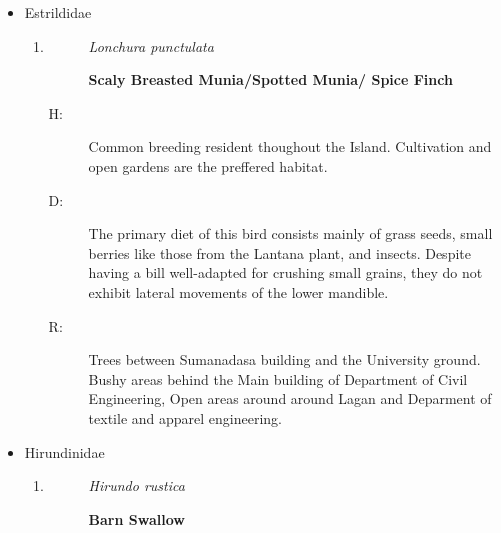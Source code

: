 \begin{itemize}
\begin{enumerate}
%
\end{enumerate}%
\item%
Estrildidae%
\begin{enumerate}%
\item%
\begin{description}%
\item[]%
\textit{Lonchura punctulata}%
\item[]%
\textbf{Scaly Breasted Munia/Spotted Munia/ Spice Finch}%
\end{description}%
\begin{description}%
\item[H: ]%
Common breeding resident thoughout the Island. Cultivation and open gardens are the preffered habitat.%
\item[D: ]%
The primary diet of this bird consists mainly of grass seeds, small berries like those from the Lantana plant, and insects. Despite having a bill well{-}adapted for crushing small grains, they do not exhibit lateral movements of the lower mandible.%
\item[R: ]%
Trees between Sumanadasa building and the University ground. Bushy areas behind the Main building of Department of Civil Engineering, Open areas around around Lagan and Deparment of textile and apparel engineering.%
\end{description}%
\end{enumerate}%
\item%
Hirundinidae%
\begin{enumerate}%
\item%
\begin{description}%
\item[]%
\textit{Hirundo rustica}%
\item[]%
\textbf{Barn Swallow}%
\end{description}%

\end{enumerate}
\end{itemize}
